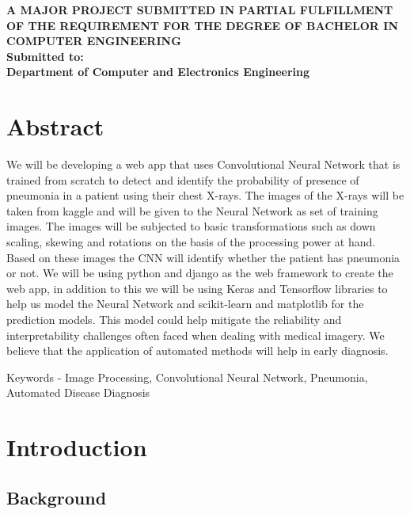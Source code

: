 \documentclass[12pt, a4paper]{report}
\begin{document}
\begin{titlepage}
\begin{center}
{}
\vfill	%
\textbf{A MAJOR PROJECT SUBMITTED IN PARTIAL FULFILLMENT OF THE REQUIREMENT FOR THE DEGREE OF BACHELOR IN COMPUTER ENGINEERING}\\

\vfill	%
\large{\textbf{Submitted to:\\
Department of Computer and Electronics Engineering}}\\
\vfill

\end{center}
\end{titlepage}


\chapter*{Abstract}

We will be developing a web app that uses Convolutional Neural Network that is trained from scratch to detect and identify the probability of presence of pneumonia in a patient using their chest X-rays. The images of the X-rays will be taken from kaggle and will be given to the Neural Network as set of training images. The images will be subjected to basic transformations such as down scaling, skewing and rotations on the basis of the processing power at hand. Based on these images the CNN will identify whether the patient has pneumonia or not. We will be using python and django as the web framework to create the web app, in addition to this we will be using Keras and Tensorflow libraries to help us model the Neural Network and scikit-learn and matplotlib for the prediction models. This model could help mitigate the reliability and interpretability challenges often faced when dealing with medical imagery. We believe that the application of automated methods will help in early diagnosis.

Keywords - Image Processing, Convolutional Neural Network, Pneumonia, Automated Disease Diagnosis
\listoffigures
\tableofcontents
\newpage

\chapter{Introduction}
\section{Background}
\end{document}
